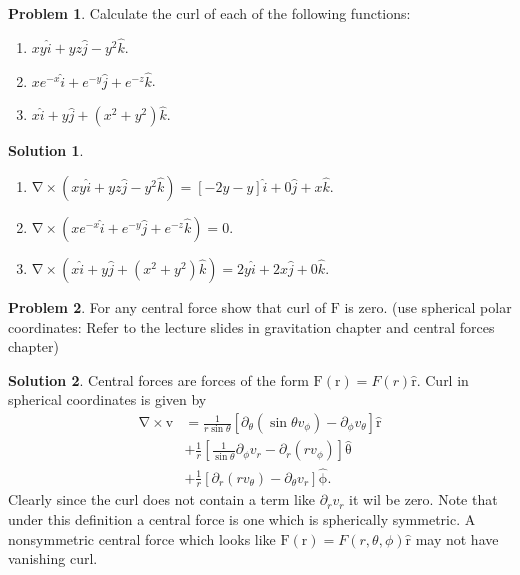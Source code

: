 \documentclass[10pt]{article}
\theoremstyle{definition}
\newtheorem{problem}{Problem}
\newtheorem{soln}{Solution}
\newcommand{\ui}{\hat{i}}
\newcommand{\uj}{\hat{j}}
\newcommand{\uk}{\hat{k}}
\newcommand{\uv}[1]{\hat{\bv{{#1}}}}
\newcommand{\bv}[1]{\bm{\mathrm{#1}}}
\begin{document}
\begin{problem}
Calculate the curl of each of the following functions:
\begin{enumerate}[label=(\alph*)]
  \item $xy\ui+yz\uj-y^2\uk$.
  \item $xe^{-x}\ui+e^{-y}\uj+e^{-z}\uk$.
  \item $x\ui+y\uj+(x^2+y^2)\uk$.
\end{enumerate}
\end{problem}
\begin{soln}~
  \begin{enumerate}[label=(\alph*)]
    \item $\bv{\nabla}\times (xy\ui+yz\uj-y^2\uk)=\left[-2y-y\right]\ui+0\uj+x\uk$.
    \item $\bv{\nabla}\times (xe^{-x}\ui+e^{-y}\uj+e^{-z}\uk)=\bv{0}$.
    \item $\bv{\nabla}\times (x\ui+y\uj+(x^2+y^2)\uk)=2y\ui+2x\uj+0\uk$.
  \end{enumerate}
\end{soln}

\begin{problem}
For any central force show that curl of $\bv{F}$ is zero. (use spherical polar coordinates: Refer to
the lecture slides in gravitation chapter and central forces chapter)
\end{problem}
\begin{soln}
  Central forces are forces of the form $\bv{F}(\bv{r})=F(r)\uv{r}$. Curl in spherical coordinates is given by
  \begin{align*}
    \bv{\nabla}\times \bv{v} & =\frac{1}{r\sin\theta}\left[\partial_\theta(\sin\theta v_\phi) -\partial_\phi v_\theta\right]\uv{r} \\
                             & +\frac{1}{r}\left[\frac{1}{\sin\theta}\partial_\phi v_r-\partial_r(rv_\phi)\right]\uv{\theta}       \\
                             & +\frac{1}{r}\left[\partial_r(rv_\theta)-\partial_\theta v_r\right]\uv{\phi}.
  \end{align*}
  Clearly since the curl does not contain a term like $\partial_rv_r$ it wil be zero. Note that under this definition a central force is one
  which is spherically symmetric. A nonsymmetric central force which looks like $\bv{F}(\bv{r})=F(r,\theta,\phi)\uv{r}$ may not have
  vanishing curl.
\end{soln}
\end{document}
